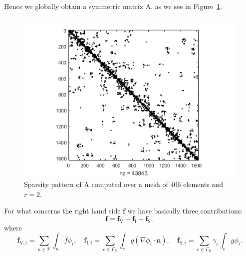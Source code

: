 \documentclass[12pt, a4paper]{article}
\theoremstyle{definition}
\theoremstyle{plain}
\theoremstyle{plain}
\begin{document}
Hence we globally obtain a symmetric matrix $\mathrm{A}$, as we see in Figure~\ref{fig:spy}.
\begin{figure}[h] 
	\centering
	\includegraphics[scale=0.8]{spy_A}
	\caption{Sparsity pattern of $\mathrm{A}$ computed over a mesh of 406 
	elements and $r=2$.}
	\label{fig:spy}
\end{figure}
\newline
For what concerns the right hand side $\mathbf{f}$ we have basically three contributions:
\begin{equation*}
\mathbf{f} = \mathbf{f}_\mathrm{V} - \mathbf{f}_\mathrm{I} + \mathbf{f}_\mathrm{S},
\end{equation*}
where
\begin{equation*}
	\mathbf{f}_{\mathrm{V}, i} = \sum_{\kappa \in \mathcal{T}} \int_\kappa f \phi_i, \quad
	\mathbf{f}_{\mathrm{I}, i} = \sum_{e \in \Gamma_D} \int_e g (\nabla \phi_i \cdot \mathbf{n}), \quad
	\mathbf{f}_{\mathrm{S}, i} = \sum_{e \in \Gamma_D} \gamma_e \int_e g \phi_i.
\end{equation*}
\end{document}
